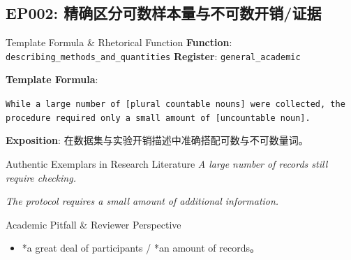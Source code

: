 \subsection{EP002: 精确区分可数样本量与不可数开销/证据}\label{sec:ep:EP002}
\begin{ConceptBox}{Template Formula \& Rhetorical Function}
\textbf{Function}: \texttt{describing\_methods\_and\_quantities} \quad \textbf{Register}: \texttt{general\_academic}\par\vspace{3pt}
\textbf{Template Formula}:\par\noindent\texttt{While a large number of [plural countable nouns] were collected, the procedure required only a small amount of [uncountable noun].}\par\vspace{4pt}
\textbf{Exposition}: 在数据集与实验开销描述中准确搭配可数与不可数量词。
\end{ConceptBox}
\begin{ExampleBox}{Authentic Exemplars in Research Literature}
\textit{A large number of records still require checking.}\par\vspace{2pt}
\textit{The protocol requires a small amount of additional information.}\par\vspace{2pt}
\end{ExampleBox}
\begin{TipBox}{Academic Pitfall \& Reviewer Perspective}
\begin{itemize}[leftmargin=1.5em, itemsep=1pt]
  \item *a great deal of participants / *an amount of records。
\end{itemize}
\end{TipBox}
\vspace{6pt}

